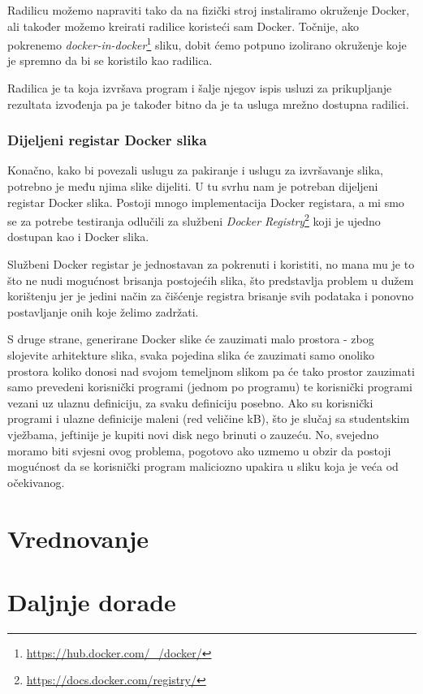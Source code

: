 \documentclass[times, utf8, zavrsni]{fer}
\begin{document}
{Radilicu možemo napraviti tako da na fizički stroj instaliramo okruženje Docker, ali također možemo kreirati radilice koristeći sam Docker. Točnije, ako pokrenemo {\textit{docker-in-docker}}{\footnote{\url{https://hub.docker.com/_/docker/}}} sliku, dobit ćemo potpuno izolirano okruženje koje je spremno da bi se koristilo kao radilica.

Radilica je ta koja izvršava program i šalje njegov ispis usluzi za prikupljanje rezultata izvođenja pa je također bitno da je ta usluga mrežno dostupna radilici.

\subsection{Dijeljeni registar Docker slika}

Konačno, kako bi povezali uslugu za pakiranje i uslugu za izvršavanje slika, potrebno je među njima slike dijeliti. U tu svrhu nam je potreban dijeljeni registar Docker slika. Postoji mnogo implementacija Docker registara, a mi smo se za potrebe testiranja odlučili za službeni {\textit{Docker Registry}}{\footnote{\url{https://docs.docker.com/registry/}}} koji je ujedno dostupan kao i Docker slika.

Službeni Docker registar je jednostavan za pokrenuti i koristiti, no mana mu je to što ne nudi mogućnost brisanja postojećih slika, što predstavlja problem u dužem korištenju jer je jedini način za čišćenje registra brisanje svih podataka i ponovno postavljanje onih koje želimo zadržati.

S druge strane, generirane Docker slike će zauzimati malo prostora - zbog slojevite arhitekture slika, svaka pojedina slika će zauzimati samo onoliko prostora koliko donosi nad svojom temeljnom slikom pa će tako prostor zauzimati samo prevedeni korisnički programi (jednom po programu) te korisnički programi vezani uz ulaznu definiciju, za svaku definiciju posebno. Ako su korisnički programi i ulazne definicije maleni (red veličine kB), što je slučaj sa studentskim vježbama, jeftinije je kupiti novi disk nego brinuti o zauzeću. No, svejedno moramo biti svjesni ovog problema, pogotovo ako uzmemo u obzir da postoji mogućnost da se korisnički program maliciozno upakira u sliku koja je veća od očekivanog.

\chapter{Vrednovanje}

\chapter{Daljnje dorade}

}
\end{document}
